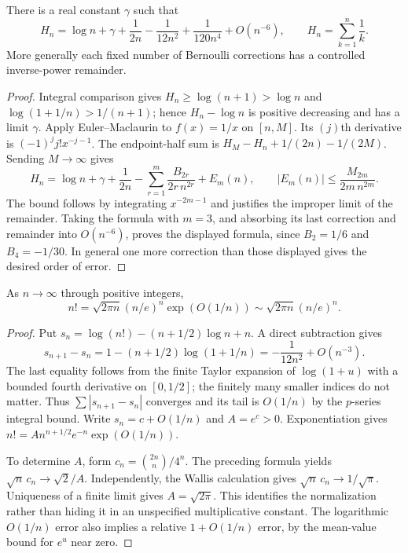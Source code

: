 \begin{proposition}
There is a real constant $\gamma$ such that
\[
 H_n=\log n+\gamma+\frac1{2n}-\frac1{12n^2}
       +\frac1{120n^4}+O(n^{-6}),\qquad H_n=\sum_{k=1}^n\frac1k.
\]
More generally each fixed number of Bernoulli corrections has a controlled
inverse-power remainder.
\end{proposition}
\begin{proof}
Integral comparison gives $H_n\geq\log(n+1)>\log n$ and
$\log(1+1/n)>1/(n+1)$; hence $H_n-\log n$ is positive decreasing and has
a limit $\gamma$. Apply Euler--Maclaurin to $f(x)=1/x$ on $[n,M]$.
Its $(j)$th derivative is $(-1)^jj!x^{-j-1}$. The endpoint-half sum is
$H_M-H_n+1/(2n)-1/(2M)$. Sending $M\to\infty$ gives
\[
 H_n=\log n+\gamma+\frac1{2n}
 -\sum_{r=1}^m\frac{B_{2r}}{2r\,n^{2r}}+E_m(n),
 \qquad |E_m(n)|\leq\frac{M_{2m}}{2m\,n^{2m}}.
\]
The bound follows by integrating $x^{-2m-1}$ and justifies the improper
limit of the remainder. Taking the formula with $m=3$, and absorbing its
last correction and remainder into $O(n^{-6})$, proves the displayed
formula, since $B_2=1/6$ and $B_4=-1/30$. In general one more correction
than those displayed gives the desired order of error.
\end{proof}

\begin{theorem}
As $n\to\infty$ through positive integers,
\[
 n!=\sqrt{2\pi n}(n/e)^n\exp(O(1/n))
     \sim\sqrt{2\pi n}(n/e)^n.
\]
\end{theorem}
\begin{proof}
Put $s_n=\log(n!)-(n+1/2)\log n+n$. A direct subtraction gives
\[
 s_{n+1}-s_n=1-(n+1/2)\log(1+1/n)
            =-\frac1{12n^2}+O(n^{-3}).
\]
The last equality follows from the finite Taylor expansion of $\log(1+u)$
with a bounded fourth derivative on $[0,1/2]$; the finitely many smaller
indices do not matter. Thus $\sum|s_{n+1}-s_n|$ converges and its tail is
$O(1/n)$ by the $p$-series integral bound. Write $s_n=c+O(1/n)$ and
$A=e^c>0$. Exponentiation gives
$n!=A n^{n+1/2}e^{-n}\exp(O(1/n))$.

To determine $A$, form $c_n=\binom{2n}{n}/4^n$. The preceding formula yields
$\sqrt n\,c_n\to\sqrt2/A$. Independently, the Wallis calculation
 gives $\sqrt n\,c_n\to1/\sqrt\pi$.
Uniqueness of a finite limit gives $A=\sqrt{2\pi}$. This identifies the
normalization rather than hiding it in an unspecified multiplicative constant.
The logarithmic $O(1/n)$ error also implies a relative $1+O(1/n)$ error,
by the mean-value bound for $e^u$ near zero.
\end{proof}

